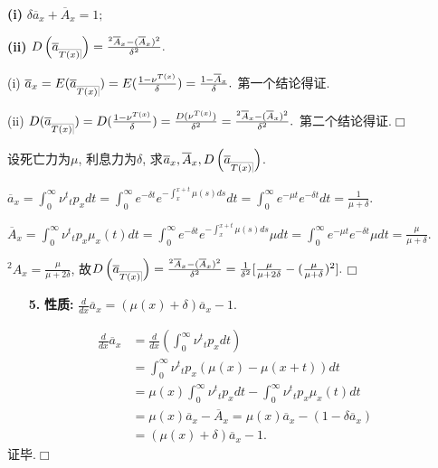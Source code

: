 \documentclass[a4paper,openany, 10pt]{ctexbook}
\makeatletter
\newcommand{\hei}{\CJKfamily{hei}}      %
\def\qed{\hfill$\Box$\medskip}
\def\z{\left}
\def\y{\right}
\DeclareRobustCommand{\annu}[1]{_{%
    \def\arraystretch{0}%
    \setlength\arraycolsep{1pt}%
    \setlength\arrayrulewidth{.2pt}%
    \begin{array}[b]{@{}c|}\hline
        \\[\arraycolsep]%
        \scriptstyle #1%
    \end{array}%
}}
\makeatother
\begin{document}
{\rm\bf(i)} $\delta \overline{a}_x + \overline{A}_x = 1;$

{\rm\bf(ii)} $D\z(\overline{a}_{\annu{T(x)}}\y) = \frac{{}^2\overline{A}_x - (\overline{A}_x)^2}{\delta^2}.$

\proof (i) $\overline{a}_x = E(\overline{a}_{\annu{T(x)}}) = E(\frac{1-\nu^{T(x)}}{\delta}) = \frac{1-\overline{A}_x}{\delta}.$ 第一个结论得证.

(ii) $D(\overline{a}_{\annu{T(x)}}) = D(\frac{1-\nu^{T(x)}}{\delta}) = \frac{D(\nu^{T(x)})}{\delta^2} = \frac{{}^2\overline{A}_x - (\overline{A}_x)^2}{\delta^2}.$ 第二个结论得证.\qed

\begin{example}
    设死亡力为$\mu$, 利息力为$\delta$, 求$\overline{a}_x, \overline{A}_x, D\z(\overline{a}_{\annu{T(x)}}\y)$.
\end{example}
\solution $\overline{a}_x = \int_0^{\infty} \nu^t {}_tp_xdt = \int_0^{\infty} e^{-\delta t}e^{-\int_{x}^{x+t}\mu(s)ds}dt = \int_0^{\infty} e^{-\mu t}e^{-\delta t}dt = \frac{1}{\mu+\delta}.$

$\overline{A}_x = \int_0^{\infty} \nu^t {}_tp_x\mu_x(t)dt = \int_0^{\infty} e^{-\delta t}e^{-\int_{x}^{x+t}\mu(s)ds}\mu dt = \int_0^{\infty} e^{-\mu t}e^{-\delta t}\mu dt = \frac{\mu}{\mu+\delta}.$

${}^2A_x = \frac{\mu}{\mu+2\delta}$, 故$D\z(\overline{a}_{\annu{T(x)}}\y) = \frac{{}^2\overline{A}_x - (\overline{A}_x)^2}{\delta^2} = \frac{1}{\delta^2}[\frac{\mu}{\mu+2\delta} - (\frac{\mu}{\mu+\delta})^2].$\qed

\begin{itemize}
    \item[{\bf\hei 5.}]{\bf \heiti 性质:} $\frac{d}{dx}\overline{a}_x = (\mu(x)+\delta)\overline{a}_x-1.$
\end{itemize}
\proof
\begin{align*}
    \frac{d}{dx}\overline{a}_x
     & = \frac{d}{dx}\z(\int_0^{\infty} \nu^t{}_tp_x dt\y)                                              \\
     & = \int_0^{\infty} \nu^t{}_tp_x(\mu(x) - \mu(x+t)) dt                                         \\
     & = \mu(x)\int_0^{\infty} \nu^t{}_tp_x dt - \int_0^{\infty} \nu^t{}_tp_x\mu_x(t) dt              \\
     & = \mu(x)\overline{a}_x - \overline{A}_x  = \mu(x)\overline{a}_x - (1-\delta\overline{a}_x) \\
     & = (\mu(x)+\delta)\overline{a}_x-1.
\end{align*}
证毕.\qed
\end{document}
